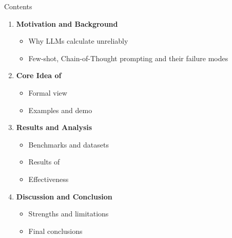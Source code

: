 \begin{frame}{Contents}

\small

\begin{enumerate}

\item \textbf{Motivation and Background}
\vspace{-0.1cm}
\begin{itemize}
    \item Why LLMs calculate unreliably
    \item Few-shot, Chain-of-Thought prompting and their failure modes
\end{itemize}

\item \textbf{Core Idea of \PAL{}}
\vspace{-0.1cm}
\begin{itemize}
    \item Formal view
    \item Examples and demo
\end{itemize}


\item \textbf{Results and Analysis}
\vspace{-0.1cm}
\begin{itemize}
    \item Benchmarks and datasets
    \item Results of \PAL{}
    \item Effectiveness
\end{itemize}

\item \textbf{Discussion and Conclusion}
\vspace{-0.1cm}
\begin{itemize}
    \item Strengths and limitations
    \item Final conclusions
\end{itemize}

\end{enumerate}

\end{frame}